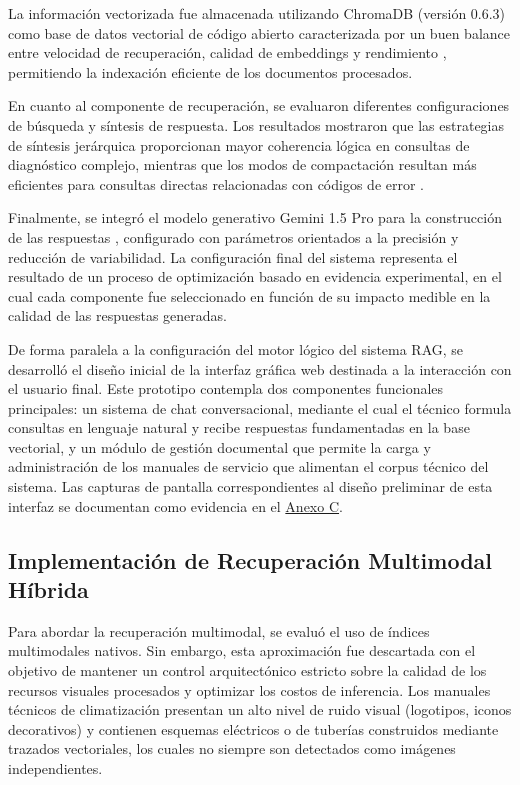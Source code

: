 {{La información vectorizada fue almacenada utilizando ChromaDB (versión 0.6.3) como base de datos vectorial de código abierto caracterizada por un buen balance entre velocidad de recuperación, calidad de embeddings y rendimiento \parencite{ammar2025optimizing}, permitiendo la indexación eficiente de los documentos procesados.

En cuanto al componente de recuperación, se evaluaron diferentes configuraciones de búsqueda y síntesis de respuesta. Los resultados mostraron que las estrategias de síntesis jerárquica proporcionan mayor coherencia lógica en consultas de diagnóstico complejo, mientras que los modos de compactación resultan más eficientes para consultas directas relacionadas con códigos de error .

Finalmente, se integró el modelo generativo Gemini 1.5 Pro para la construcción de las respuestas \parencite{reid2024gemini}, configurado con parámetros orientados a la precisión y reducción de variabilidad. La configuración final del sistema representa el resultado de un proceso de optimización basado en evidencia experimental, en el cual cada componente fue seleccionado en función de su impacto medible en la calidad de las respuestas generadas.

De forma paralela a la configuración del motor lógico del sistema RAG, se desarrolló el diseño inicial de la interfaz gráfica web destinada a la interacción con el usuario final. Este prototipo contempla dos componentes funcionales principales: un sistema de chat conversacional, mediante el cual el técnico formula consultas en lenguaje natural y recibe respuestas fundamentadas en la base vectorial, y un módulo de gestión documental que permite la carga y administración de los manuales de servicio que alimentan el corpus técnico del sistema. Las capturas de pantalla correspondientes al diseño preliminar de esta interfaz se documentan como evidencia en el \hyperlink{anexo:C}{Anexo C}.

\subsection{Implementación de Recuperación Multimodal Híbrida}

Para abordar la recuperación multimodal, se evaluó el uso de índices multimodales nativos. Sin embargo, esta aproximación fue descartada con el objetivo de mantener un control arquitectónico estricto sobre la calidad de los recursos visuales procesados y optimizar los costos de inferencia. Los manuales técnicos de climatización presentan un alto nivel de ruido visual (logotipos, iconos decorativos) y contienen esquemas eléctricos o de tuberías construidos mediante trazados vectoriales, los cuales no siempre son detectados como imágenes independientes.

}}
